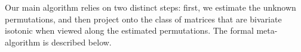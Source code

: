 \documentclass[final,12pt]{colt2018} %
\begin{document}
%
%

Our main algorithm relies on two distinct steps: first, we estimate the unknown permutations, and then project onto the class of matrices that are bivariate isotonic when viewed along the estimated permutations. The formal meta-algorithm is described below. 

\end{document}
